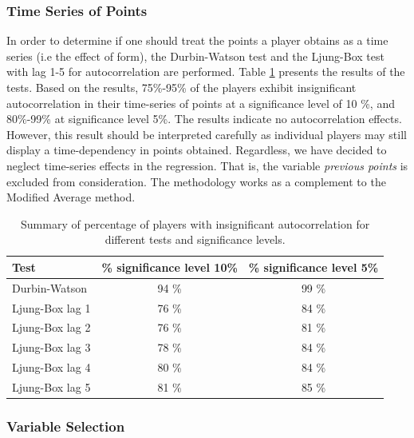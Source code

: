 \subsubsection{Time Series of Points}

In order to determine if one should treat the points a player obtains as a time series (i.e the effect of form), the Durbin-Watson test and the Ljung-Box test with lag 1-5 for autocorrelation are performed. Table \ref{tab:auto_tests} presents the results of the tests. Based on the results, 75\%-95\% of the players exhibit insignificant autocorrelation in their time-series of points at a significance level of 10 \%, and 80\%-99\% at significance level 5\%. The results indicate no autocorrelation effects. However, this result should be interpreted carefully as individual players may still display a time-dependency in points obtained. Regardless, we have decided to neglect time-series effects in the regression. That is, the variable \textit{previous points} is excluded from consideration. The methodology works as a complement to the Modified Average method.

\begin{table}[H]
\centering
\begin{tabular}{|l|c|c|}
\hline
Test            & \% significance level 10\% & \% significance level 5\% \\
\hline
Durbin-Watson   & 94 \% & 99 \%                                            \\
Ljung-Box lag 1 & 76 \% & 84 \%                                            \\
Ljung-Box lag 2 & 76 \% & 81 \%                                            \\
Ljung-Box lag 3 & 78 \% & 84 \%                                            \\
Ljung-Box lag 4 & 80 \% & 84 \%                                           \\
Ljung-Box lag 5 & 81 \% & 85 \%                
\\
\hline
\end{tabular}
\caption{Summary of percentage of players with insignificant autocorrelation for different tests and significance levels.}
\label{tab:auto_tests}
\end{table}

\subsubsection{Variable Selection}

